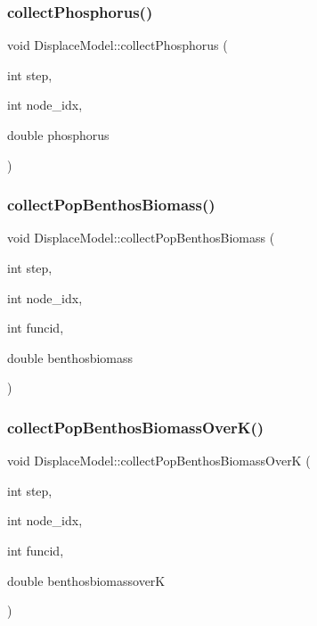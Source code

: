 \mbox{\label{class_displace_model_a186f4b09ed2ae8eaf8644d095a6350e8}} 
\subsubsection{\texorpdfstring{collectPhosphorus()}{collectPhosphorus()}}
{\footnotesize\ttfamily void Displace\+Model\+::collect\+Phosphorus (\begin{DoxyParamCaption}\item[{int}]{step,  }\item[{int}]{node\+\_\+idx,  }\item[{double}]{phosphorus }\end{DoxyParamCaption})}

\mbox{\label{class_displace_model_a00f5227fe870431d73c91a64ae2f1fe5}} 
\subsubsection{\texorpdfstring{collectPopBenthosBiomass()}{collectPopBenthosBiomass()}}
{\footnotesize\ttfamily void Displace\+Model\+::collect\+Pop\+Benthos\+Biomass (\begin{DoxyParamCaption}\item[{int}]{step,  }\item[{int}]{node\+\_\+idx,  }\item[{int}]{funcid,  }\item[{double}]{benthosbiomass }\end{DoxyParamCaption})}

\mbox{\label{class_displace_model_a926bcad2019c03271853082fab2b79cf}} 
\subsubsection{\texorpdfstring{collectPopBenthosBiomassOverK()}{collectPopBenthosBiomassOverK()}}
{\footnotesize\ttfamily void Displace\+Model\+::collect\+Pop\+Benthos\+Biomass\+OverK (\begin{DoxyParamCaption}\item[{int}]{step,  }\item[{int}]{node\+\_\+idx,  }\item[{int}]{funcid,  }\item[{double}]{benthosbiomassoverK }\end{DoxyParamCaption})}

